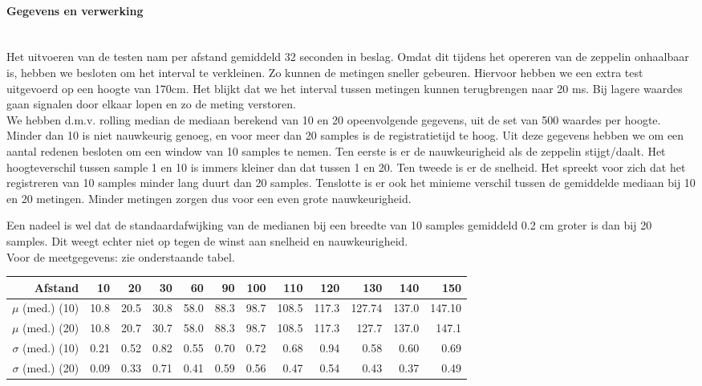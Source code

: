 \documentclass[eind]{penoverslag}
\begin{document}
\paragraph{Gegevens en verwerking} ~\\ 
Het uitvoeren van de testen nam per afstand gemiddeld 32 seconden in beslag. Omdat dit tijdens het opereren van de zeppelin onhaalbaar is, hebben we besloten om het interval te verkleinen. Zo kunnen de metingen sneller gebeuren. Hiervoor hebben we een extra test uitgevoerd op een hoogte van 170cm. Het blijkt dat we het interval tussen metingen kunnen terugbrengen naar 20 ms. Bij lagere waardes gaan signalen door elkaar lopen en zo de meting verstoren. \\

We hebben d.m.v. rolling median de mediaan berekend van 10 en 20 opeenvolgende gegevens, uit de set van 500 waardes per hoogte. Minder dan 10 is niet nauwkeurig genoeg, en voor meer dan 20 samples is de registratietijd te hoog. Uit deze gegevens hebben we om een aantal redenen besloten om een window van 10 samples te nemen.  Ten eerste is er de nauwkeurigheid als de zeppelin stijgt/daalt. Het hoogteverschil tussen sample 1 en 10 is immers kleiner dan dat tussen 1 en 20. Ten tweede is er de snelheid. Het spreekt voor zich dat het registreren van 10 samples minder lang duurt dan 20 samples. Tenslotte is er ook het minieme verschil tussen de gemiddelde mediaan bij 10 en 20 metingen. Minder metingen zorgen dus voor een even grote nauwkeurigheid. 

Een nadeel is wel dat de standaardafwijking van de medianen bij een breedte van 10 samples gemiddeld 0.2 cm groter is dan bij 20 samples. Dit weegt echter niet op tegen de winst aan snelheid en nauwkeurigheid.\\ 

Voor de meetgegevens: zie onderstaande tabel. \\

\begin{tabular}{r||r|r|r|r|r|r|r|r|r|r|r}
\textbf{Afstand} & 10 & 20 & 30 & 60 & 90 & 100 & 110 & 120 & 130 & 140 & 150 \\
\hline \hline 
$\mu$ (med.) (10) & 10.8 & 20.5 & 30.8 & 58.0 & 88.3 & 98.7 & 108.5 & 117.3 & 127.74 & 137.0 & 147.10 \\
$\mu$ (med.) (20) & 10.8 & 20.7 & 30.7 & 58.0 & 88.3 & 98.7 & 108.5 & 117.3 & 127.7 & 137.0 & 147.1 \\
$\sigma$ (med.) (10) & 0.21 & 0.52 & 0.82 & 0.55 & 0.70 & 0.72 & 0.68 & 0.94 & 0.58 & 0.60 & 0.69 \\
$\sigma$ (med.) (20)& 0.09 & 0.33 & 0.71 & 0.41 & 0.59 & 0.56 & 0.47 & 0.54 & 0.43 & 0.37 & 0.49 \\
\end{tabular}
\end{document}
